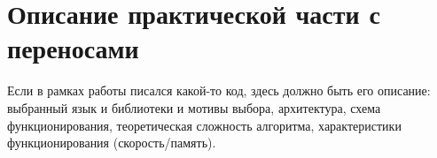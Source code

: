 
\section[Опи\-са\-ние практи\-чес\-кой час\-ти с переносами]{Описание практической части с переносами}

Если в рамках работы писался какой-то код, здесь должно быть его описание: выбранный язык и библиотеки и мотивы выбора, архитектура, схема функционирования, теоретическая сложность алгоритма, характеристики функционирования (скорость/память).